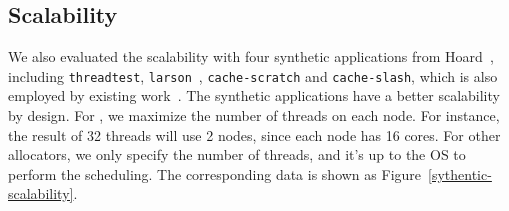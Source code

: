  

\subsection{Scalability}
\label{sec:scale}

We also evaluated the scalability with four synthetic applications from Hoard~\cite{Hoard}, including \texttt{threadtest}, \texttt{larson}~\cite{Larson}, \texttt{cache-scratch} and \texttt{cache-slash}, which is also employed by existing work~\cite{Scalloc}. The synthetic applications have a better scalability by design. 
For \NM{}, we maximize the number of threads on each node. For instance, the result of 32 threads will use 2 nodes, since each node has 16 cores. For other allocators, we only specify the number of threads, and it's up to the OS to perform the scheduling. The corresponding data is shown as Figure~\ref{sythentic-scalability}. 

